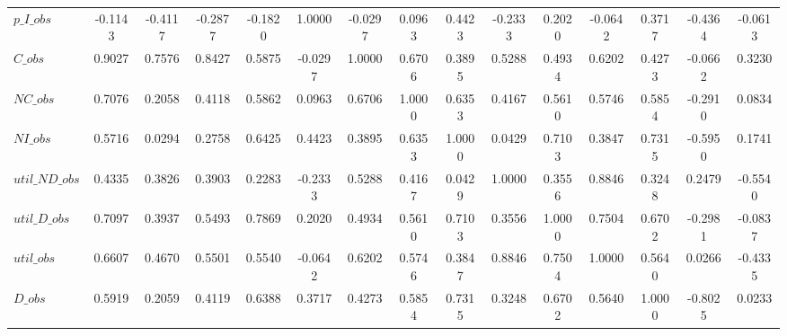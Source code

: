 \begin{center}
\begin{longtable}{lcccccccccccccc}
$p\_I\_obs      $	 & 	          -0.1143	 & 	          -0.4117	 & 	          -0.2877	 & 	          -0.1820	 & 	           1.0000	 & 	          -0.0297	 & 	           0.0963	 & 	           0.4423	 & 	          -0.2333	 & 	           0.2020	 & 	          -0.0642	 & 	           0.3717	 & 	          -0.4364	 & 	          -0.0613 \\ 
$C\_obs         $	 & 	           0.9027	 & 	           0.7576	 & 	           0.8427	 & 	           0.5875	 & 	          -0.0297	 & 	           1.0000	 & 	           0.6706	 & 	           0.3895	 & 	           0.5288	 & 	           0.4934	 & 	           0.6202	 & 	           0.4273	 & 	          -0.0662	 & 	           0.3230 \\ 
$NC\_obs        $	 & 	           0.7076	 & 	           0.2058	 & 	           0.4118	 & 	           0.5862	 & 	           0.0963	 & 	           0.6706	 & 	           1.0000	 & 	           0.6353	 & 	           0.4167	 & 	           0.5610	 & 	           0.5746	 & 	           0.5854	 & 	          -0.2910	 & 	           0.0834 \\ 
$NI\_obs        $	 & 	           0.5716	 & 	           0.0294	 & 	           0.2758	 & 	           0.6425	 & 	           0.4423	 & 	           0.3895	 & 	           0.6353	 & 	           1.0000	 & 	           0.0429	 & 	           0.7103	 & 	           0.3847	 & 	           0.7315	 & 	          -0.5950	 & 	           0.1741 \\ 
$util\_ND\_obs  $	 & 	           0.4335	 & 	           0.3826	 & 	           0.3903	 & 	           0.2283	 & 	          -0.2333	 & 	           0.5288	 & 	           0.4167	 & 	           0.0429	 & 	           1.0000	 & 	           0.3556	 & 	           0.8846	 & 	           0.3248	 & 	           0.2479	 & 	          -0.5540 \\ 
$util\_D\_obs   $	 & 	           0.7097	 & 	           0.3937	 & 	           0.5493	 & 	           0.7869	 & 	           0.2020	 & 	           0.4934	 & 	           0.5610	 & 	           0.7103	 & 	           0.3556	 & 	           1.0000	 & 	           0.7504	 & 	           0.6702	 & 	          -0.2981	 & 	          -0.0837 \\ 
$util\_obs      $	 & 	           0.6607	 & 	           0.4670	 & 	           0.5501	 & 	           0.5540	 & 	          -0.0642	 & 	           0.6202	 & 	           0.5746	 & 	           0.3847	 & 	           0.8846	 & 	           0.7504	 & 	           1.0000	 & 	           0.5640	 & 	           0.0266	 & 	          -0.4335 \\ 
$D\_obs         $	 & 	           0.5919	 & 	           0.2059	 & 	           0.4119	 & 	           0.6388	 & 	           0.3717	 & 	           0.4273	 & 	           0.5854	 & 	           0.7315	 & 	           0.3248	 & 	           0.6702	 & 	           0.5640	 & 	           1.0000	 & 	          -0.8025	 & 	           0.0233 \\ 

\end{longtable}
\end{center}
